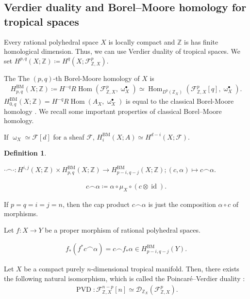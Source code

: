 \documentclass[a4paper,dvipdfmx,reqno,12pt]{amsart}
\theoremstyle{definition}
\newtheorem{definition}[theorem]{Definition}
\newcommand{\deq}{\coloneqq}
\newcommand{\Z}{\mathbb{Z}}%
\newcommand{\mcal}[1]{\mathcal{#1}}%
\newcommand{\opn}[1]{\operatorname{#1}}
\numberwithin{equation}{section}
\begin{document}
\subsection{Verdier duality and Borel--Moore homology
for tropical spaces}

Every rational polyhedral space $X$ is locally compact and $\Z$ is has finite homological dimension.
Thus, we can use Verdier duality of tropical spaces.
We set $H^{p,q}(X;\mathbb{Z})\deq 
H^{q}(X;\mathcal{F}_{\mathbb{Z},X}^{p})$.



The The $(p,q)$-th Borel-Moore homology of $X$ is
\begin{align}
H^{\opn{BM}}_{p,q}(X;\Z)\deq 
H^{-q}R\opn{Hom}(\mathcal{F}_{\mathbb{Z},X}^{p},\upomega_X^{\bullet})\simeq 
\opn{Hom}_{D^{b}(\mathbb{Z}_X)}(\mathcal{F}_{\mathbb{Z},X}^{p}[q],\upomega_X^{\bullet}).
\end{align}
$H_{0,q}^{\opn{BM}}(X;\Z)=
H^{-q}R\opn{Hom}(A_X,\upomega_X^{\bullet})$ is equal to the classical Borel-Moore homology
\cite[Lemma 4.8]{gross2019sheaftheoretic}.
We recall some important properties of 
classical Borel--Moore homology.

If $\upomega_X\simeq \mcal{F}[d]$ for a sheaf $\mcal{F}$,
$H_i^{\opn{BM}}(X;A)\simeq H^{d-i}(X;\mcal{F})$.

\begin{definition}
  
\end{definition}

$\cdot \frown \cdot \colon
H^{i,j}(X;\mathbb{Z}) \times 
H_{p,q}^{\opn{BM}}(X;\mathbb{Z})\to 
H_{p-i,q-j}^{\opn{BM}}(X;\mathbb{Z});(c,\alpha) \mapsto c\frown \alpha$.

\begin{align}
c\frown \alpha \deq  \alpha\circ \mu_X \circ 
(c\otimes \opn{id}).
\end{align}

If $p=q=i=j=n$, then the cap product $c\frown \alpha$ 
is just the composition $\alpha \circ c$ of 
morphisms.

Let $f\colon X \to Y $ be a proper morphism of 
rational polyhedral spaces.

\begin{align}
  f_*(f^{*}c\frown \alpha)=
c\frown f_*\alpha\in H_{p-i,q-j}^{\opn{BM}}(Y).
\end{align}



Let $X$ be a compact
purely $n$-dimensional tropical manifold.
Then, there exists the following natural isomorphism, 
which is called the Poincar\'e--Verdier duality 
\cite[Theorem 6.2]{gross2019sheaftheoretic}:
\begin{align}
\opn{PVD}\colon \mathcal{F}_{\mathbb{Z},X}^{n-p}[n]
\simeq 
\mathcal{D}_{\mathbb{Z}_X}(\mathcal{F}_{\mathbb{Z},X}^{p}).
\end{align}
\end{document}
